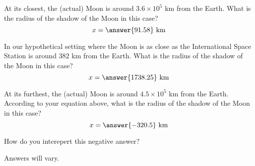 \documentclass{ximera}
\begin{document}
\begin{problem}
  At its closest, the (actual) Moon is around $3.6\times 10^5$ km from
  the Earth.  What is the radius of the shadow of the Moon in this
  case?
  \[
  x = \answer{91.58} \text{ km}
  \]
\end{problem}

\begin{problem}
  In our hypothetical setting where the Moon is as close as the
  International Space Station is around $382$ km from the Earth.  What
  is the radius of the shadow of the Moon in this case?
  \[
  x = \answer{1738.25} \text{ km}
  \]
\end{problem}



\begin{problem}
  At its furthest, the (actual) Moon is around $4.5\times 10^5$ km
  from the Earth.  According to your equation above, what is the
  radius of the shadow of the Moon in this case?
  \[
  x = \answer{-320.5} \text{ km}
  \]
  \begin{problem}
    How do you interepert this negative answer?
    \begin{freeResponse}
      Answers will vary.
    \end{freeResponse}
  \end{problem}
\end{problem}
\end{document}
